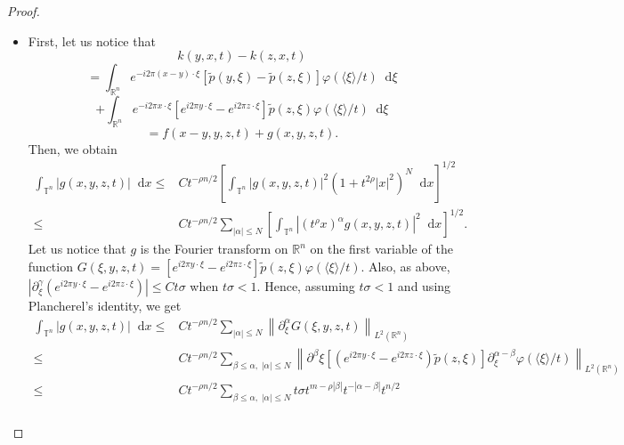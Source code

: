 \documentclass[10pt,a4paper]{amsart}
\newcommand*\diff{\mathop{}\!\mathrm{d}}
\begin{document}
\begin{proof}
\begin{itemize}
        \item[(c)] First, let us notice that
        \begin{equation*}
            k(y, x, t) - k(z, x, t) 
        \end{equation*}
        \begin{equation*}
            =\int_{\mathbb{R}^n} e^{-i2\pi (x-y) \cdot \xi}[\tilde{p}(y, \xi) - \tilde{p}(z, \xi)]\varphi(\langle\xi\rangle/t) \diff \xi
        \end{equation*}
        \begin{equation*}
            +  
            \int_{\mathbb{R}^n} e^{-i2\pi x \cdot \xi} \left[ e^{i2\pi y \cdot \xi} -e^{i2\pi z \cdot \xi}  \right]\tilde{p}(z, \xi)\varphi(\langle\xi\rangle/t) \diff \xi
        \end{equation*}
        \begin{equation*}
            =f(x-y, y, z, t) + g(x, y, z, t).
        \end{equation*}
        Then, we obtain 
        \begin{align*}
            \int_{\mathbb{T}^n}|g(x, y, z, t)|\diff x \leq & Ct^{-\rho n/2} \left[ \int_{\mathbb{T}^n} |g(x, y, z, t)|^2(1 + t^{2\rho}|x|^2)^N \diff x  \right]^{1/2}\\
            \leq & Ct^{-\rho n/2} \sum_{|\alpha|\leq N}  \left[ \int_{\mathbb{T}^n} |(t^\rho x)^\alpha g(x, y, z, t)|^2\diff x  \right]^{1/2}.
        \end{align*}
        Let us notice that $g$ is the Fourier transform on $\mathbb{R}^n$ on the first variable of the function $G(\xi, y, z, t) = \left[ e^{i2\pi y \cdot \xi} -e^{i2\pi z \cdot \xi}  \right]\tilde{p}(z, \xi)\varphi(\langle\xi\rangle/t)$. Also, as above, $|\partial^\gamma_\xi( e^{i2\pi y \cdot \xi} -e^{i2\pi z \cdot \xi}  )| \leq Ct\sigma$ when $t\sigma<1$. Hence, assuming $t\sigma < 1$ and using Plancherel's identity, we get
        \begin{align*}
            \int_{\mathbb{T}^n}|g(x, y, z, t)|\diff x \leq &Ct^{-\rho n/2} \sum_{|\alpha|\leq N} \left\| \partial^\alpha_\xi G(\xi, y, z ,t) \right\|_{L^2(\mathbb{R}^n)}\\ 
            \leq &Ct^{-\rho n/2} \sum_{\beta\leq\alpha,\;|\alpha|\leq N} \left\| \partial^\beta\xi \left[ (e^{i2\pi y \cdot \xi} -e^{i2\pi z \cdot \xi})  \tilde{p}(z, \xi)\right]  \partial^{\alpha-\beta}_\xi\varphi(\langle\xi\rangle/t)  \right\|_{L^2(\mathbb{R}^n)} \\
            \leq & Ct^{-\rho n/2} \sum_{\beta\leq\alpha,\;|\alpha|\leq N} t\sigma t^{m-\rho|\beta|}t^{-|\alpha-\beta|}t^{n/2} \\

\end{align*}
\end{itemize}
\end{proof}
\end{document}
